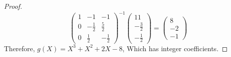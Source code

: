 \documentclass[11pt]{article}
\theoremstyle{definition}
\begin{document}
\begin{proof}
        \[
             \begin{pmatrix}
                1 & -1 & -1 \\
                0 & -\frac{1}{2} & \frac{5}{2} \\
                0 &  \frac{1}{2} & -\frac{1}{2}
            \end{pmatrix}^{-1}
            \begin{pmatrix}
                11 \\
                -\frac{3}{2} \\
                -\frac{1}{2}
            \end{pmatrix}
             =
            \begin{pmatrix}
                8 \\
                -2 \\
                -1
            \end{pmatrix}
        \]
        Therefore, $g(X) = X^3 +X^2 +2X -8$, Which has integer coefficients.


    \end{proof}
    
\end{document}
